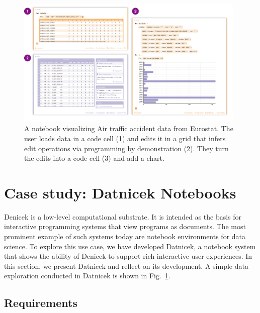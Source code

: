 \documentclass[sigconf,anonymous,screen]{acmart}
\begin{document}

\begin{figure}[t]
\vspace{-0.5em}
\includegraphics[width=0.98\textwidth,clip,trim=0cm 1cm 1cm 0.5cm]{fig/datnicek.pdf}
\vspace{-0.5em}
\caption{A notebook visualizing Air traffic accident data from Eurostat. The user loads data in
a code cell (1) and edits it in a grid that infers edit operations via programming by demonstration
(2). They turn the edits into a code cell (3) and add a chart.}
\label{fig:datnicek}
\vspace{-0.5em}
\end{figure}


\section{Case study: Datnicek Notebooks}
\label{sec:case}

Denicek is a low-level computational substrate. It is intended as the basis for interactive
programming systems that view programs as documents. The most prominent example of such systems
today are notebook environments for data science. To explore this use case, we have developed
Datnicek, a notebook system that shows the ability of Denicek to support rich interactive user
experiences. In this section, we present Datnicek and reflect on its development. A simple data
exploration conducted in Datnicek is shown in Fig.~\ref{fig:datnicek}.

\subsection{Requirements}
\label{sec:case-req}
\end{document}
